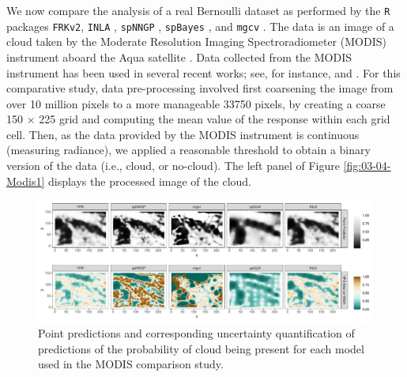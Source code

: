 We now compare the analysis of a real Bernoulli dataset as performed by the \texttt{R} packages \texttt{FRKv2}, \texttt{INLA} \citep{Lindgren_2015_R-INLA},  \texttt{spNNGP} \citep{Finley_2020_spNNGP}, \texttt{spBayes} \citep{Finley_2015_spBayes}, and \texttt{mgcv} \citep{Wood_2017_GAM:R}. 
The data is an image of a cloud taken by the Moderate Resolution Imaging Spectroradiometer (MODIS) instrument aboard the Aqua satellite \citep{MODIS_satelitte}. 
Data collected from the MODIS instrument has been used in several recent works; see, for instance, \cite{Sengupta_2016_MODIS} and  \cite{ZammitMangion_2020_Deep_compositional_spatial_model}.
For this comparative study, data pre-processing involved first coarsening the image from over 10 million pixels to a more manageable 33750 pixels, by creating a coarse 150 $\times$ 225 grid and computing the mean value of the response within each grid cell. 
Then, as the data provided by the MODIS instrument is continuous (measuring radiance), we applied a reasonable threshold to obtain a binary version of the data (i.e., cloud, or no-cloud).
The left panel of Figure \ref{fig:03-04-Modis1} displays the processed image of the cloud. 




\begin{figure}[t!]
    \centering
    \includegraphics[width = \linewidth]{Images/MODIS_pred_and_uncert.pdf}
     \caption{Point predictions and corresponding uncertainty quantification of predictions of the probability of cloud being present for each model used in the MODIS comparison study. }   
  \label{fig:MODIS:pred_and_uncert}
\end{figure}


